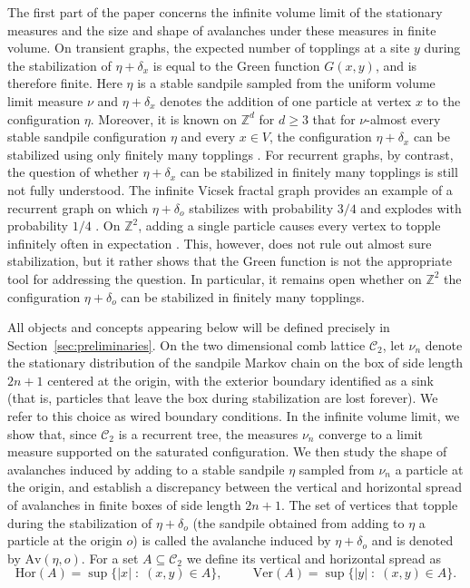 \documentclass[11pt]{article}
\newcommand{\Z}{\mathbb{Z}}
\begin{document}
The first part of the paper concerns the infinite volume limit of the stationary measures and the size and shape of avalanches under these measures in finite volume. On transient graphs, the expected number of topplings at a site $y$ during the stabilization of $\eta+\delta_x$ is equal to the Green function $G(x,y)$, and is therefore finite. Here $\eta$ is a stable sandpile sampled from the uniform volume limit measure $\nu$ and $\eta +\delta_x$ denotes the addition of one particle at vertex $x$ to the configuration $\eta$. Moreover, it is known on $\Z^d$ for $d\geq 3$ that for $\nu$-almost every stable sandpile configuration $\eta$ and every $x\in V$, the configuration $\eta+\delta_x$ can be stabilized using only finitely many topplings \cite{JR08, J18}. 
For recurrent graphs, by contrast, the question of whether $\eta+\delta_x$ can be stabilized in finitely many topplings is still not fully understood. The infinite Vicsek fractal graph provides an example of a recurrent graph on which \(\eta+\delta_o\) stabilizes with probability \(3/4\) and explodes with probability \(1/4\) \cite{HKS25_vic}. On \(\mathbb{Z}^2\), adding a single particle causes every vertex to topple infinitely often in expectation \cite{J18}. This, however, does not rule out almost sure stabilization, but it rather shows that the Green function is not the appropriate tool for addressing the question. In particular, it remains open whether on $\mathbb{Z}^2$ the configuration $\eta+\delta_o$ can be stabilized in finitely many topplings.

All objects and concepts appearing below will be defined precisely in Section~\ref{sec:preliminaries}. On the two dimensional comb lattice $\mathcal{C}_2$, let $\nu_n$ denote the stationary distribution of the sandpile Markov chain on the box of side length $2n+1$ centered at the origin, with the exterior boundary identified as a sink (that is, particles that leave the box during stabilization are lost forever). We refer to this choice as wired boundary conditions. In the infinite volume limit, we show that, since $\mathcal{C}_2$ is a recurrent tree, the measures $\nu_n$ converge to a limit measure supported on the saturated configuration. We then study the shape of avalanches induced by adding  to a stable sandpile $\eta$ sampled from $\nu_n$ a particle at the origin, and establish a discrepancy between the vertical and horizontal spread of avalanches in finite boxes  of side length $2n+1$. The set of vertices that topple during the stabilization of $\eta+\delta_{o}$ (the sandpile obtained from adding to $\eta$ a particle at the origin $o$) is called the avalanche induced by $\eta+\delta_o$ and is denoted by $\text{Av}(\eta,o)$. For a set $A\subseteq\mathcal{C}_2$ we define its vertical and horizontal spread as
$$\text{Hor}(A)=\sup\{|x|\;:\; (x,y)\in A\},\hspace{1cm}\text{Ver}(A)=\sup\{|y|\;:\;(x,y)\in A\}.$$
\end{document}
